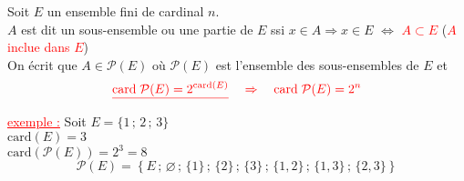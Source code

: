 \documentclass[a4paper,12pt]{article}
\begin{document}
Soit $E$ un ensemble fini de cardinal $n$.\\
$A$ est dit un sous-ensemble ou une partie de $E$ ssi $x \in A \Rightarrow x \in E$ $\Leftrightarrow$ \textcolor{red}{\underline{$A \subset E$}} \quad (\textcolor{red}{\small $A$ inclue dans $E$})\\
On écrit que $A \in \mathcal{P}(E)$ où $\mathcal{P}(E)$ est l’ensemble des sous-ensembles de $E$ et 
\[
\textcolor{red}{\underline{\text{card} \; \mathcal{P}(E) = 2^{\text{card}(E)}} \quad \Rightarrow \quad \text{card} \; \mathcal{P}(E) = 2^n}
\]

\textcolor{red}{\underline{exemple :}} Soit $E = \{1\, ;\, 2\, ;\, 3\}$\\
$\text{card}(E) = 3$\\
$\text{card}(\mathcal{P}(E)) = 2^3 = 8$\\
\[
\mathcal{P}(E) = \left\{ 
E\, ;\,
\varnothing\, ;\,
\{1\}\, ;\,
\{2\}\, ;\,
\{3\}\, ;\,
\{1,2\}\, ;\,
\{1,3\}\, ;\,
\{2,3\}
\right\}
\]
\end{document}
